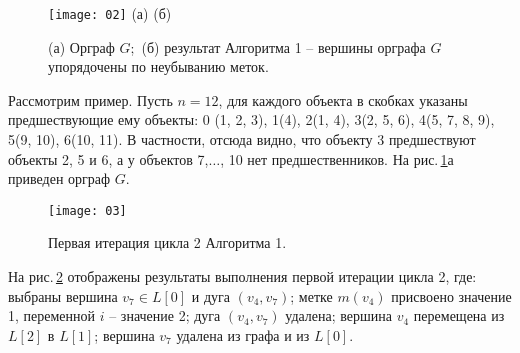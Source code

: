 \begin{figure}[H]
{\texttt{[image: 02]}}
{\small %
\hspace{4cm}(а) \hspace{8cm} (б)\\
}
\caption{(а) Орграф $G$;\ (б) результат Алгоритма 1 -- вершины орграфа $G$ упорядочены по неубыванию меток.}
\label{akmfig2}
\end{figure}
\par\medskip
Рассмотрим пример. Пусть $n=12$, для каждого объекта в скобках указаны предшествующие ему объекты: 0 (1, 2, 3), 1(4), 2(1, 4), 3(2, 5, 6), 4(5, 7, 8, 9), 5(9, 10), 6(10, 11). В частности, отсюда видно, что объекту 3 предшествуют объекты 2, 5 и 6, а у объектов 7,$\dots$, 10 нет предшественников. На рис.\,\ref{akmfig2}а приведен орграф $G$.
\begin{figure}[H]
{\texttt{[image: 03]}}
\caption{Первая итерация цикла 2 Алгоритма 1.}
\label{akmfig3}
\end{figure}
%
\par\medskip\medskip
На рис.\,\ref{akmfig3} отображены результаты выполнения первой итерации цикла 2, где: выбраны вершина ${v_7\in L[0]}$ и дуга ${(v_4,v_7)}$; метке ${m(v_4)}$ присвоено значение 1, переменной $i$ -- значение 2; дуга ${(v_4,v_7)}$ удалена; вершина $v_4$ перемещена из $L[2]$ в $L[1]$; вершина $v_7$ удалена из графа и из $L[0]$.

